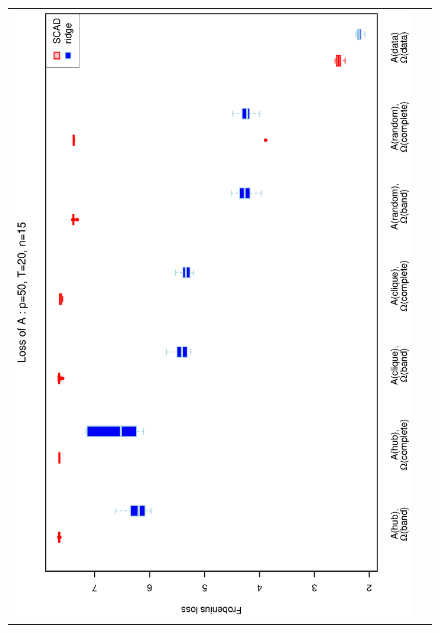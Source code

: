 \documentclass[a4paper]{article}
\begin{document}
\begin{figure}[h!]
\centering
\begin{tabular}{cc}
\includegraphics[scale=0.45,angle=270]{LossA50T20N15_25.eps}
\\

\end{tabular}
\end{figure}
\end{document}
